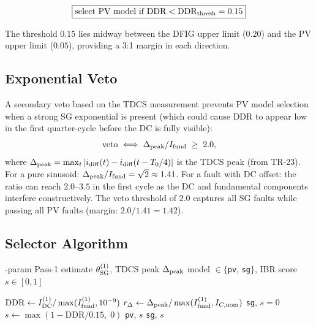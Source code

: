 \documentclass[11pt, a4paper]{article}
\begin{document}
\begin{equation}
  \boxed{\text{select PV model if DDR} < \text{DDR}_{\rm thresh} = 0.15}
  \label{eq:selector}
\end{equation}

The threshold $0.15$ lies midway between the DFIG upper limit ($0.20$)
and the PV upper limit ($0.05$), providing a 3:1 margin in each direction.

\subsection{Exponential Veto}

A secondary veto based on the TDCS measurement prevents PV model selection
when a strong SG exponential is present (which could cause DDR to appear
low in the first quarter-cycle before the DC is fully visible):
\begin{equation}
  \text{veto} \;\Longleftrightarrow\; \Delta_{\rm peak} / I_{\rm fund} \;\geq\; 2.0,
  \label{eq:veto}
\end{equation}
where $\Delta_{\rm peak} = \max_t |i_{\rm diff}(t) - i_{\rm diff}(t - T_0/4)|$
is the TDCS peak (from TR-23).  For a pure sinusoid:
$\Delta_{\rm peak}/I_{\rm fund} = \sqrt{2} \approx 1.41$.  For a fault with
DC offset: the ratio can reach $2.0$--$3.5$ in the first cycle as the DC
and fundamental components interfere constructively.  The veto threshold
of $2.0$ captures all SG faults while passing all PV faults (margin: $2.0/1.41 = 1.42$).

\subsection{Selector Algorithm}

\begin{algorithm}[!t]
\caption{k$_{\rm ibr}$-Driven Model Selector (per relay cycle)}
\label{alg:selector}
\begin{algorithmic}[1]
-param Pass-1 estimate $\theta_{\rm SG}^{(1)}$, TDCS peak $\Delta_{\rm peak}$
\Ensure model $\in \{$\texttt{pv}, \texttt{sg}$\}$, IBR score $s \in [0,1]$

\State $\text{DDR} \gets I_{\rm DC}^{(1)} / \max(I_{\rm fund}^{(1)}, 10^{-9})$
\State $r_\Delta \gets \Delta_{\rm peak} / \max(I_{\rm fund}^{(1)}, I_{C,\rm nom})$
  \Return \texttt{sg}, $s=0$
\EndIf
\State $s \gets \max(1 - \text{DDR}/0.15,\; 0)$
  \Return \texttt{pv}, $s$
\Else
  \Return \texttt{sg}, $s$
\EndIf
\end{algorithmic}
\end{algorithm}
\end{document}
